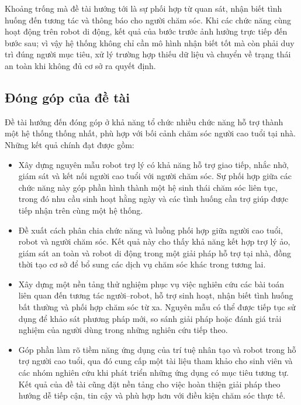 Khoảng trống mà đề tài hướng tới là sự phối hợp từ quan sát, nhận biết tình huống đến tương tác và thông báo cho người chăm sóc. Khi các chức năng cùng hoạt động trên robot di động, kết quả của bước trước ảnh hưởng trực tiếp đến bước sau; vì vậy hệ thống không chỉ cần mô hình nhận biết tốt mà còn phải duy trì đúng người mục tiêu, xử lý trường hợp thiếu dữ liệu và chuyển về trạng thái an toàn khi không đủ cơ sở ra quyết định.

\subsection{Đóng góp của đề tài}

Đề tài hướng đến đóng góp ở khả năng tổ chức nhiều chức năng hỗ trợ thành một hệ thống thống nhất, phù hợp với bối cảnh chăm sóc người cao tuổi tại nhà. Những kết quả chính đạt được gồm:

\begin{itemize}
    \item Xây dựng nguyên mẫu robot trợ lý có khả năng hỗ trợ giao tiếp, nhắc nhở, giám sát và kết nối người cao tuổi với người chăm sóc. Sự phối hợp giữa các chức năng này góp phần hình thành một hệ sinh thái chăm sóc liên tục, trong đó nhu cầu sinh hoạt hằng ngày và các tình huống cần trợ giúp được tiếp nhận trên cùng một hệ thống.
    \item Đề xuất cách phân chia chức năng và luồng phối hợp giữa người cao tuổi, robot và người chăm sóc. Kết quả này cho thấy khả năng kết hợp trợ lý ảo, giám sát an toàn và robot di động trong một giải pháp hỗ trợ tại nhà, đồng thời tạo cơ sở để bổ sung các dịch vụ chăm sóc khác trong tương lai.
    \item Xây dựng một nền tảng thử nghiệm phục vụ việc nghiên cứu các bài toán liên quan đến tương tác người--robot, hỗ trợ sinh hoạt, nhận biết tình huống bất thường và phối hợp chăm sóc từ xa. Nguyên mẫu có thể được tiếp tục sử dụng để khảo sát phương pháp mới, so sánh giải pháp hoặc đánh giá trải nghiệm của người dùng trong những nghiên cứu tiếp theo.
    \item Góp phần làm rõ tiềm năng ứng dụng của trí tuệ nhân tạo và robot trong hỗ trợ người cao tuổi, qua đó cung cấp một tài liệu tham khảo cho sinh viên và các nhóm nghiên cứu khi phát triển những ứng dụng có mục tiêu tương tự. Kết quả của đề tài cũng đặt nền tảng cho việc hoàn thiện giải pháp theo hướng dễ tiếp cận, tin cậy và phù hợp hơn với điều kiện chăm sóc thực tế.
\end{itemize}

